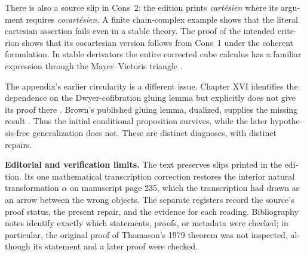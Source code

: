 \begin{otherlanguage}{english}
There is also a source slip in Cons~2: the edition prints \emph{cart\'esien} where its argument requires \emph{cocart\'esien}. A finite chain-complex example shows that the literal cartesian assertion fails even in a stable theory. The proof of the intended criterion shows that its cocartesian version follows from Cons~1 under the coherent formulation. In stable derivators the entire corrected cube calculus has a familiar expression through the Mayer--Vietoris triangle \citep[Theorems~6.1 and 7.1, arXiv v2]{GrothPontoShulman2014}.

The appendix's earlier circularity is a different issue. Chapter XVI identifies the dependence on the Dwyer-cofibration gluing lemma but explicitly does not give its proof there \citep[\S3, ms.~pp.~18--23]{GrothendieckDerivateursXVI}. Brown's published gluing lemma, dualized, supplies the missing result \citep[Part~I, \S4, Lemma~2]{Brown1973}. Thus the initial conditional proposition survives, while the later hypothesis-free generalization does not. These are distinct diagnoses, with distinct repairs.

\medskip\noindent\textbf{Editorial and verification limits.}
The text preserves slips printed in the edition. Its one mathematical transcription correction restores the interior natural transformation $\alpha$ on manuscript page 235, which the transcription had drawn as an arrow between the wrong objects. The separate registers record the source's proof status, the present repair, and the evidence for each reading. Bibliography notes identify exactly which statements, proofs, or metadata were checked; in particular, the original proof of Thomason's 1979 theorem was not inspected, although its statement and a later proof were checked.

\endgroup
\end{otherlanguage}
\dgrchunkend
